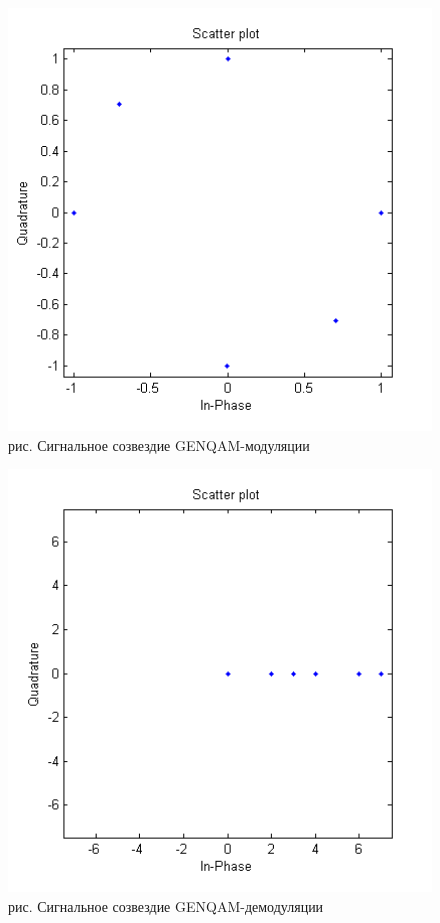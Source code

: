 \documentclass[10pt,a4paper]{report}
\begin{document}
\begin{figure}
\begin{center}
\includegraphics[width=150mm, scale = 0.9]{9_7}\newline
рис.  Сигнальное созвездие GENQAM-модуляции\newline
\end{center}
\end{figure}
\begin{figure}
\begin{center}
\includegraphics[width=150mm, scale = 0.9]{9_8}\newline
рис. Сигнальное созвездие GENQAM-демодуляции\newline
\end{center}
\end{figure}
\end{document}
